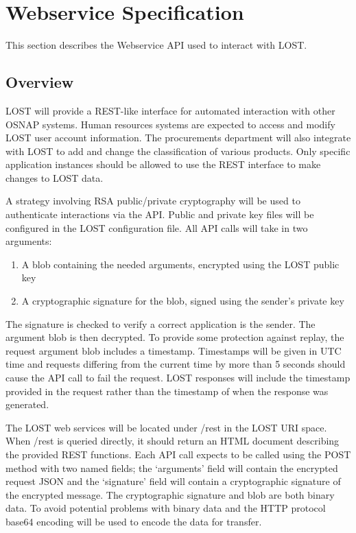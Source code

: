 \chapter*{Webservice Specification}
This section describes the Webservice API used to interact with LOST.

\section*{Overview}
LOST will provide a REST-like interface for automated interaction with other OSNAP systems. Human resources systems are expected to access and modify LOST user account information. The procurements department will also integrate with LOST to add and change the classification of various products. Only specific application instances should be allowed to use the REST interface to make changes to LOST data.

A strategy involving RSA public/private cryptography will be used to authenticate interactions via the API. Public and private key files will be configured in the LOST configuration file. All API calls will take in two arguments:
\begin{enumerate}
\item A blob containing the needed arguments, encrypted using the LOST public key
\item A cryptographic signature for the blob, signed using the sender's private key
\end{enumerate}
The signature is checked to verify a correct application is the sender. The argument blob is then decrypted. To provide some protection against replay, the request argument blob includes a timestamp. Timestamps will be given in UTC time and requests differing from the current time by more than 5 seconds should cause the API call to fail the request. LOST responses will include the timestamp provided in the request rather than the timestamp of when the response was generated.

The LOST web services will be located under /rest in the LOST URI space. When /rest is queried directly, it should return an HTML document describing the provided REST functions. Each API call expects to be called using the POST method with two named fields; the `arguments' field will contain the encrypted request JSON and the `signature' field will contain a cryptographic signature of the encrypted message. The cryptographic signature and blob are both binary data. To avoid potential problems with binary data and the HTTP protocol base64 encoding will be used to encode the data for transfer. 


